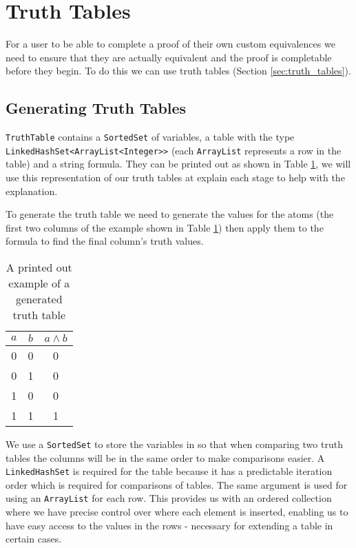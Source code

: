 \documentclass{report}
\begin{document}
\section{Truth Tables}
\label{sec:generating_truth_tables}

For a user to be able to complete a proof of their own custom equivalences we need to ensure that they are actually equivalent and the proof is completable before they begin. To do this we can use truth tables (Section \ref{sec:truth_tables}).

\subsection{Generating Truth Tables}

{\tt TruthTable} contains a {\tt SortedSet} of variables, a table with the type {\tt LinkedHashSet<ArrayList<Integer>>} (each {\tt ArrayList} represents a row in the table) and a string formula. They can be printed out as shown in Table \ref{table:generated_truth_table}, we will use this representation of our truth tables at explain each stage to help with the explanation. 

To generate the truth table we need to generate the values for the atoms (the first two columns of the example shown in Table \ref{table:generated_truth_table}) then apply them to the formula to find the final column's truth values.

\begin{table}[h]
  \begin{center}
    \begin{tabular}{ | c | c || c | }
      \hline
      $a$ & $b$ & $a \land b$ \\ \hline
      0 & 0 & 0 \\
      0 & 1 & 0 \\
      1 & 0 & 0 \\
      1 & 1 & 1 \\
      \hline
    \end{tabular}
  \end{center}
  \caption{A printed out example of a generated truth table}
  \label{table:generated_truth_table}
\end{table}

We use a {\tt SortedSet} to store the variables in so that when comparing two truth tables the columns will be in the same order to make comparisons easier. A {\tt LinkedHashSet} is required for the table because it has a predictable iteration order which is required for comparisons of tables. The same argument is used for using an {\tt ArrayList} for each row. This provides us with an ordered collection where we have precise control over where each element is inserted, enabling us to have easy access to the values in the rows - necessary for extending a table in certain cases.
\end{document}

